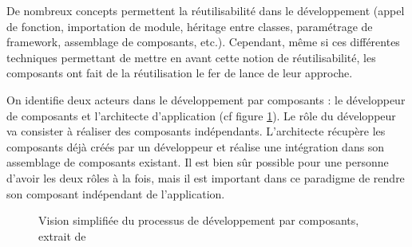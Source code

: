   De nombreux concepts permettent la réutilisabilité dans le développement (appel de fonction, importation de module, héritage entre classes, paramétrage de framework, assemblage de composants, etc.). Cependant, même si ces différentes techniques permettant de mettre en avant cette notion de réutilisabilité, les composants ont fait de la réutilisation le fer de lance de leur approche.\\\par  
    
  On identifie deux acteurs dans le développement par composants \cite{fabresse2007decoupage} : le dévelop\-peur de composants et l’architecte d’application (cf figure \ref{fig:reusecomponent}). Le rôle du développeur va consister à réaliser des composants indépendants. L'architecte récupère les composants déjà créés par un développeur et réalise une intégration dans son assemblage de composants existant. Il est bien sûr possible pour une personne d'avoir les deux rôles à la fois, mais il est important dans ce paradigme de rendre son composant indépendant de l'application. \\\par 
      
\begin{figure}[!t]
\centering
{}
\caption{Vision simplifiée du processus de développement par composants, extrait de \cite{fabresse2007decoupage}}
\label{fig:reusecomponent}
\end{figure}
  
